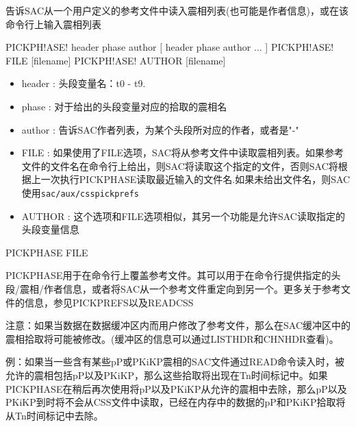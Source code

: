 \label{cmd:pickphase}

告诉SAC从一个用户定义的参考文件中读入震相列表(也可能是作者信息)，或在该命令行上输入震相列表

\begin{SACSTX}
PICKPH!ASE! header phase author [ header phase author ... ]
PICKPH!ASE! FILE [filename]
PICKPH!ASE! AUTHOR [filename]
\end{SACSTX}

\begin{itemize}
\item header : 头段变量名：t0 - t9.
\item phase : 对于给出的头段变量对应的拾取的震相名
\item author : 告诉SAC作者列表，为某个头段所对应的作者，或者是"-"
\item FILE : 如果使用了FILE选项，SAC将从参考文件中读取震相列表。如果参考文件的文件名在命令行上给出，则SAC将读取这个指定的文件，否则SAC将根据上一次执行PICKPHASE读取最近输入的文件名.如果未给出文件名，则SAC使用\texttt{sac/aux/csspickprefs}
\item AUTHOR : 这个选项和FILE选项相似，其另一个功能是允许SAC读取指定的头段变量信息
\end{itemize}

PICKPHASE FILE

PICKPHASE用于在命令行上覆盖参考文件。其可以用于在命令行提供指定的头段/震相/作者信息，或者将SAC从一个参考文件重定向到另一个。更多关于参考文件的信息，参见PICKPREFS以及READCSS

注意：如果当数据在数据缓冲区内而用户修改了参考文件，那么在SAC缓冲区中的震相拾取将可能被修改。(缓冲区的信息可以通过LISTHDR和CHNHDR查看)。

例：如果当一些含有某些pP或PKiKP震相的SAC文件通过READ命令读入时，被允许的震相包括pP以及PKiKP，那么这些拾取将出现在Tn时间标记中。如果PICKPHASE在稍后再次使用将pP以及PKiKP从允许的震相中去除，那么pP以及PKiKP到时将不会从CSS文件中读取，已经在内存中的数据的pP和PKiKP拾取将从Tn时间标记中去除。
